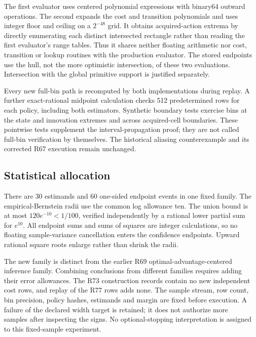 

The first evaluator uses centered polynomial expressions with binary64 outward operations. The second expands the cost and transition polynomials and uses integer floor and ceiling on a $2^{-48}$ grid. It obtains acquired-action extrema by directly enumerating each distinct intersected rectangle rather than reading the first evaluator's range tables. Thus it shares neither floating arithmetic nor cost, transition or lookup routines with the production evaluator. The stored endpoints use the hull, not the more optimistic intersection, of these two evaluations. Intersection with the global primitive support is justified separately.

Every new full-bin path is recomputed by both implementations during replay. A further exact-rational midpoint calculation checks 512 predetermined rows for each policy, including both estimators. Synthetic boundary tests exercise bins at the state and innovation extremes and across acquired-cell boundaries. These pointwise tests supplement the interval-propagation proof; they are not called full-bin verification by themselves. The historical aliasing counterexample and its corrected R67 execution remain unchanged.

\subsection{Statistical allocation}
There are 30 estimands and 60 one-sided endpoint events in one fixed family. The empirical-Bernstein radii use the common log allowance ten. The union bound is at most $120e^{-10}<1/100$, verified independently by a rational lower partial sum for $e^{10}$. All endpoint sums and sums of squares are integer calculations, so no floating sample-variance cancellation enters the confidence endpoints. Upward rational square roots enlarge rather than shrink the radii.

The new family is distinct from the earlier R69 optimal-advantage-centered inference family. Combining conclusions from different families requires adding their error allowances. The R73 construction records contain no new independent cost rows, and replay of the R77 rows adds none. The sample stream, row count, bin precision, policy hashes, estimands and margin are fixed before execution. A failure of the declared width target is retained; it does not authorize more samples after inspecting the signs. No optional-stopping interpretation is assigned to this fixed-sample experiment.

